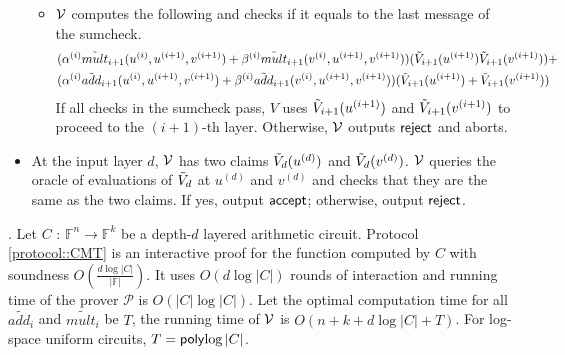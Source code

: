 \begin{protocol}
\begin{itemize}
\begin{itemize}
		
			\item $\mathcal{V}$ computes the following and checks if it equals to the last message of the sumcheck.
			\begin{align*}
			&(\alpha^{(i)}\tilde{mult}_{i+1}(u^{(i)}, u^{(i+1)}, v^{(i+1)})+\beta^{(i)}\tilde{mult}_{i+1}(v^{(i)}, u^{(i+1)}, v^{(i+1)}))(\tilde{V}_{i+1}(u^{(i+1)})\tilde{V}_{i+1}(v^{(i+1)}))+\\
			&(\alpha^{(i)}\tilde{add}_{i+1}(u^{(i)}, u^{(i+1)}, v^{(i+1)})+\beta^{(i)}\tilde{add}_{i+1}(v^{(i)}, u^{(i+1)}, v^{(i+1)}))(\tilde{V}_{i+1}(u^{(i+1)})+\tilde{V}_{i+1}(v^{(i+1)}))
			\end{align*}
			If all checks in the sumcheck pass, $V$ uses $\tilde{V}_{i+1}(u^{(i+1)})$ and $\tilde{V}_{i+1}(v^{(i+1)})$ to proceed to the $(i+1)$-th layer. Otherwise, $\mathcal{V}$ outputs $\mathsf{reject}$ and aborts.
			
		\end{itemize}
		\item At the input layer $d$, $\mathcal{V}$ has two claims $\tilde{V}_{d}(u^{(d)})$ and $\tilde{V}_{d}(v^{(d)})$. $\mathcal{V}$ queries the oracle of evaluations of $\tilde{V}_d$ at $u^{(d)}$ and $v^{(d)}$ and checks that they are the same as the two claims. If yes, output $\mathsf{accept}$; otherwise, output $\mathsf{reject}$.
		
	\end{itemize}
\end{protocol}

\begin{theorem}\cite{VSA13}\cite{JT_Thesis}\cite{CMT}\cite{GKR}. Let $C$ : $\mathbb{F}^n \rightarrow \mathbb{F}^k$ be a depth-$d$ layered arithmetic circuit. Protocol \ref{protocol::CMT} is an interactive proof for the function computed by $C$ with soundness $O(\frac{d\log {|C|}}{|\mathbb{F}|})$. It uses $O(d \log |C|)$ rounds of interaction and running time of the prover $\mathcal{P}$ is $O(|C|\log |C|)$. Let the optimal computation time for all $\tilde{add_i}$ and $\tilde{mult_i}$ be $T$, the running time of $\mathcal{V}$ is $O(n+k+d\log |C|+T)$. For log-space uniform circuits, $T={\sf poly}{\log |C|}$.
\end{theorem}